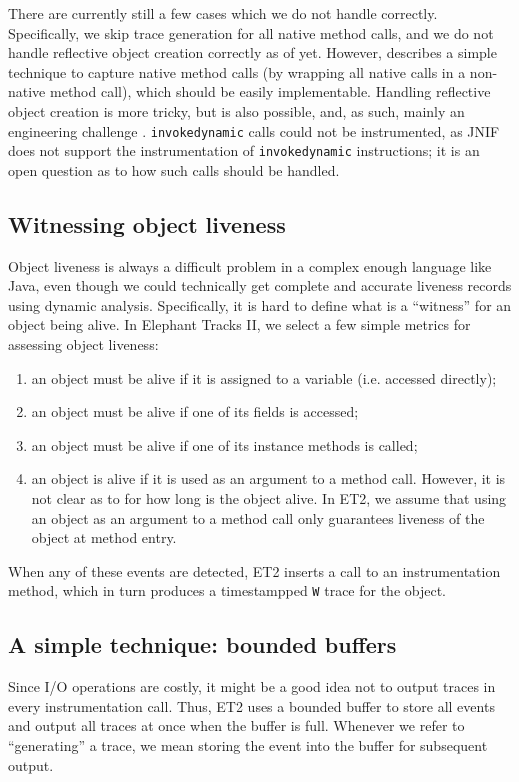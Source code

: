 There are currently still a few cases which we do not handle correctly. Specifically, we skip trace generation for all native method calls, and we
do not handle reflective object creation correctly as of yet. However, \cite{ElephantTracks} describes a simple technique to capture native method
calls (by wrapping all native calls in a non-native method call), which should be easily implementable. Handling reflective object creation is more
tricky, but is also possible, and, as such, mainly an engineering challenge \citep{ElephantTracks}. \lstinline{invokedynamic} calls could not be
instrumented, as JNIF does not support the instrumentation of \lstinline{invokedynamic} instructions; it is an open question as to how such calls
should be handled.

\subsection{Witnessing object liveness}
Object liveness is always a difficult problem in a complex enough language like Java, even though we could technically get complete and accurate
liveness records using dynamic analysis. Specifically, it is hard to define what is a ``witness'' for an object being alive. In Elephant Tracks II, we
select a few simple metrics for assessing object liveness:
\begin{enumerate}
\item an object must be alive if it is assigned to a variable (i.e. accessed directly);
\item an object must be alive if one of its fields is accessed;
\item an object must be alive if one of its instance methods is called;
\item an object is alive if it is used as an argument to a method call. However, it is not clear as to for how long is the object alive. In ET2, we assume
  that using an object as an argument to a method call only guarantees liveness of the object at method entry.
\end{enumerate}

When any of these events are detected, ET2 inserts a call to an instrumentation method, which in turn produces a timestampped \lstinline{W} trace for the object.

\subsection{A simple technique: bounded buffers}
Since I/O operations are costly, it might be a good idea not to output traces in every instrumentation call. Thus, ET2 uses a bounded buffer to store all
events and output all traces at once when the buffer is full. Whenever we refer to ``generating'' a trace, we mean storing the event into the buffer for
subsequent output.

